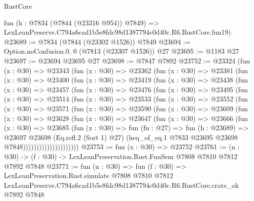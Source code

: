 \begin{lexlean}{RustCore}
\begin{coremodule}
    fun (h : @7834 (@7844 (@23316 @954)) @7849) =>
    LexLeanPreserve.C794a6cad1b5e8fdc98d1387794c0d40c.R6.RustCore.fun19)
@23689 := @7834 (@7844 (@23302 @1526)) @7849
@23694 := Option.noConfusion.{0, 0} (@7813 (@23307 @1526)) @27
@23695 := @1183 @27
@23697 := @23694 @23695 @27
@23698 := @7847 @7892
@23752 := @23324
    (fun (x : @30) =>
    @23343
      (fun (x : @30) =>
      @23362
        (fun (x : @30) =>
        @23381
          (fun (x : @30) =>
          @23400
            (fun (x : @30) =>
            @23419
              (fun (x : @30) =>
              @23438
                (fun (x : @30) =>
                @23457
                  (fun (x : @30) =>
                  @23476
                    (fun (x : @30) =>
                    @23495
                      (fun (x : @30) =>
                      @23514
                        (fun (x : @30) =>
                        @23533
                          (fun (x : @30) =>
                          @23552
                            (fun (x : @30) =>
                            @23571
                              (fun (x : @30) =>
                              @23590
                                (fun (x : @30) =>
                                @23609
                                  (fun (x : @30) =>
                                  @23628
                                    (fun (x : @30) =>
                                    @23647
                                      (fun (x : @30) =>
                                      @23666
                                        (fun (x : @30) =>
                                        @23685
                                          (fun (x : @30) =>
                                          fun (fn : @27) =>
                                          fun (h : @23689) =>
                                          @23697
                                            @23698
                                            (Eq.refl.{2} (Sort 1) @27)
                                            (heq_of_eq.{1}
                                              @7833
                                              @23695
                                              @23698
                                              @7848)))))))))))))))))))))
@23753 := fun (x : @30) => @23752
@23761 := (n : @30) -> (f : @30) -> LexLeanPreservation.Rust.FunSem @7808 @7810 @7812 @7892 @7848
@23771 := fun (n : @30) =>
  fun (f : @30) =>
  LexLeanPreservation.Rust.simulate
    @7808
    @7810
    @7812
    LexLeanPreserve.C794a6cad1b5e8fdc98d1387794c0d40c.R6.RustCore.crate_ok
    @7892
    @7848
\end{coremodule}
\end{lexlean}
